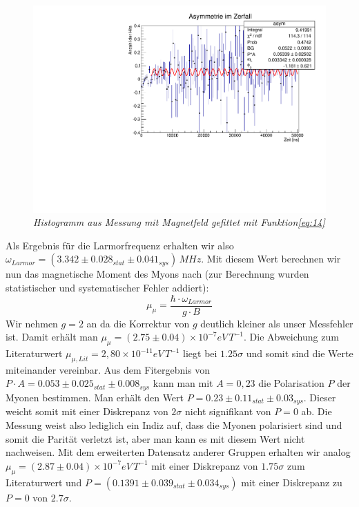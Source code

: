 \begin{figure}[h]
	\centering
	\includegraphics[width=120mm]{Asymmetrie}
	\caption{ \itshape Histogramm aus Messung mit Magnetfeld gefittet mit Funktion\ref{eq:14}}
	\label{fig:Abbildung 3}
\end{figure}
\noindent Als Ergebnis für die Larmorfrequenz erhalten wir also $\omega_{Larmor} = (3.342 \pm 0.028_{stat} \pm 0.041_{sys})\, MHz$. Mit diesem Wert berechnen wir nun das magnetische Moment des Myons nach (zur Berechnung wurden statistischer und systematischer Fehler addiert):
\begin{equation}
\mu _{\mu} = \frac{\hbar \cdot
 \omega_{Larmor}}{g\cdot B}
\end{equation}
Wir nehmen $g=2$ an da die Korrektur von $g$ deutlich kleiner als unser Messfehler ist. Damit erhält man $\mu_{\mu}  = (2.75  \pm 0.04)\times 10^{-7} eV \, T^{-1}$. Die Abweichung zum Literaturwert $\mu_{\mu, Lit} = 2,80 \times 10^{-11} eV \, T^{-1}$ liegt bei $1.25\sigma$ und somit sind die Werte miteinander vereinbar.
Aus dem Fitergebnis von $P\cdot A = 0.053\pm 0.025_{stat} \pm 0.008_{sys}$ kann man mit $A=0,23$ die Polarisation $P$ der Myonen bestimmen. Man erhält den Wert $P = 0.23 \pm 0.11_{stat} \pm 0.03_{sys}$. Dieser weicht somit mit einer Diskrepanz von $2\sigma$ nicht signifikant von $P=0$ ab. Die Messung weist also lediglich ein Indiz auf, dass die Myonen polarisiert sind und somit die Parität verletzt ist, aber man kann es mit diesem Wert nicht nachweisen. Mit dem erweiterten Datensatz anderer Gruppen erhalten wir analog $\mu_{\mu} = (2.87 \pm 0.04)\times 10^{-7} eV \, T^{-1}$ mit einer Diskrepanz von $1.75\sigma$ zum Literaturwert und $P = (0.1391 \pm 0.039_{stat} \pm 0.034_{sys})$ mit einer Diskrepanz zu $P=0$ von $2.7\sigma$.
